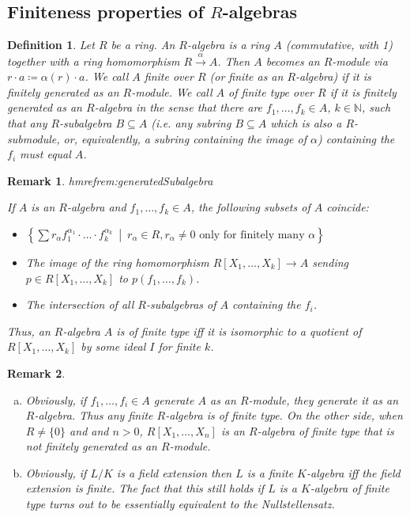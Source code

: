 \documentclass[DIV=14,parskip=full,pointednumbers]{scrartcl}
\theoremstyle{cthm}
\theoremstyle{cdef}
\newtheorem{defi}{Definition}[subsection]
\newtheorem{rem}{Remark}[subsection]
\newcommand{\lbl}[1]{
	\label{#1}
	\edef\dummy{\curthm}
	\expandafter\xdef\csname thmref#1\endcsname{\dummy}
}
\newcommand{\IN}{\mathbb{N}}
\newcommand{\longto}{\longrightarrow}
\newcommand{\st}{\ \middle|\ }
\begin{document}
\subsection{Finiteness properties of \texorpdfstring{$R$}{R}-algebras}
\begin{defi}
 Let $R$ be a ring. An \emph{$R$-algebra} is a ring $A$ (commutative, with 1) together with a ring homomorphism $R\overset{\alpha}{\longto} A$. Then $A$ becomes an $R$-module via $r\cdot a \coloneqq \alpha(r) \cdot a$. We call $A$ \emph{finite over $R$} (or \emph{finite as an $R$-algebra}) if it is finitely generated as an $R$-module. We call $A$ of \emph{finite type over $R$} if it is finitely generated as an $R$-algebra in the sense that there are $f_1,\ldots, f_k\in A$, $k\in \IN$, such that any $R$-subalgebra $B\subseteq A$ (i.e. any subring $B\subseteq A$ which is also a $R$-submodule, or, equivalently, a subring containing the image of $\alpha$) containing the $f_i$ must equal $A$.
\end{defi}
\begin{rem}\lbl{rem:generatedSubalgebra}
 If $A$ is an $R$-algebra and $f_1,\ldots,f_k\in A$, the following subsets of $A$ coincide:
 \begin{itemize}
  \item $\left\{\sum r_\alpha f_1^{\alpha_1}\cdot\ldots\cdot f_k^{\alpha_k}\st r_\alpha\in R, r_\alpha\neq 0 \text{ only for finitely many } \alpha\right\}$
  \item The image of the ring homomorphism $R[X_1,\ldots,X_k]\to A$ sending $p\in R[X_1,\ldots, X_k]$ to $p(f_1,\ldots,f_k)$.
  \item The intersection of all $R$-subalgebras of $A$ containing the $f_i$.
 \end{itemize}
Thus, an $R$-algebra $A$ is of finite type iff it is isomorphic to a quotient of $R[X_1,\ldots, X_k]$ by some ideal $I$ for finite $k$.
\end{rem}
\begin{rem}
\begin{enumerate}[a)]
 \item Obviously, if $f_1,\ldots, f_i\in A$ generate $A$ as an $R$-module, they generate it as an $R$-algebra. Thus any finite $R$-algebra is of finite type. On the other side, when $R\neq \{0\}$ and and $n>0$, $R[X_1, \ldots, X_n]$ is an $R$-algebra of finite type that is not finitely generated as an $R$-module.
\item Obviously, if $L/K$ is a field extension then $L$ is a finite $K$-algebra iff the field extension is finite. The fact that this still holds if $L$ is a $K$-algebra of finite type turns out to be essentially equivalent to the Nullstellensatz.
 \end{enumerate}

\end{rem}
\end{document}
